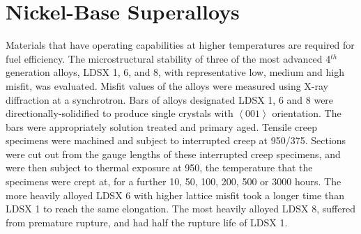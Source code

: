 \section{Nickel-Base Superalloys}
Materials that have operating capabilities at higher temperatures are required for fuel efficiency. The microstructural stability of three of the most advanced 4$^{th}$ generation alloys, LDSX 1, 6, and 8, with representative low, medium and high misfit, was evaluated. Misfit values of the alloys were measured using X-ray diffraction at a synchrotron. Bars of alloys designated LDSX 1, 6 and 8 were directionally-solidified to produce single crystals with $\left<001\right>$ orientation. The bars were appropriately solution treated and primary aged. Tensile creep specimens were machined and subject to interrupted creep at 950\celsius/375\mega\pascal. Sections were cut out from the gauge lengths of these interrupted creep specimens, and were then subject to thermal exposure at 950\celsius, the temperature that the specimens were crept at, for a further 10, 50, 100, 200, 500 or 3000 hours. The more heavily alloyed LDSX 6 with higher lattice misfit took a longer time than LDSX 1 to reach the same elongation. The most heavily alloyed LDSX 8, suffered from premature rupture, and had half the rupture life of LDSX 1. 
